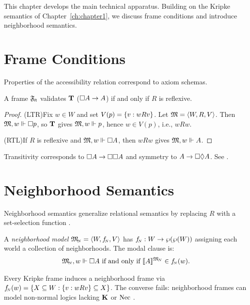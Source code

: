 
This chapter develops the main technical apparatus.  Building on
the Kripke semantics of Chapter~\ref{ch:chapter1}, we discuss
frame conditions and introduce neighborhood semantics.

\section{Frame Conditions}

Properties of the accessibility relation correspond to axiom
schemas.

\begin{proposition}\label{prop:reflexivity}
  A frame ${\mathfrak{F}_{\!\scriptscriptstyle R}}$ validates $\textbf{T}$ ($\Box A \to A$) if and only if
  $R$ is reflexive.
\end{proposition}

\begin{proof}
  (LTR)\quad Fix $w \in W$ and set $V(p) = \{v :
  wRv\}$.  Let $\mathfrak{M}=\langle W,R,V\rangle$.  Then $\mathfrak{M},w\Vdash \Box p$, so $\textbf{T}$ gives $\mathfrak{M},w\Vdash
  p$, hence $w \in V(p)$, i.e., $wRw$.

  (RTL)\quad If $R$ is reflexive and $\mathfrak{M},w\Vdash \Box A$,
  then $wRw$ gives $\mathfrak{M},w\Vdash A$.
\end{proof}

\begin{note}\label{note:correspondences}
  Transitivity corresponds to $\Box A \to \Box\Box A$ and
  symmetry to $A \to \Box\Diamond A$.  See
  \textcite[ch.~3]{blackburn2001}.
\end{note}

\section{Neighborhood Semantics}

Neighborhood semantics generalize relational semantics by
replacing $R$ with a set-selection function
\cite{scott1970, pacuit2017}.

\begin{definition}\label{def:nbhd-model}
  A \textit{neighborhood model} ${\mathfrak{M}_{\!\scriptscriptstyle N}} = \langle W, {f_{\!\scriptscriptstyle N}}, V \rangle$ has ${f_{\!\scriptscriptstyle N}} : W \to \wp(\wp(W))$ assigning each world
  a collection of neighborhoods.  The modal clause is:
  \[
    {\mathfrak{M}_{\!\scriptscriptstyle N}},w\Vdash \Box A \text{ if and only if }
    \llbracket A\rrbracket^{{\mathfrak{M}_{\!\scriptscriptstyle N}}} \in {f_{\!\scriptscriptstyle N}}(w).
  \]
\end{definition}

\begin{remark}\label{rem:generalization}
  Every Kripke frame induces a neighborhood frame via ${f_{\!\scriptscriptstyle N}}(w) =
  \{X \subseteq W : \{v : wRv\} \subseteq X\}$.  The converse
  fails: neighborhood frames can model non-normal logics lacking
  $\textbf{K}$ or $\textnormal{Nec}$ \parencite{chellas1980}.
\end{remark}

